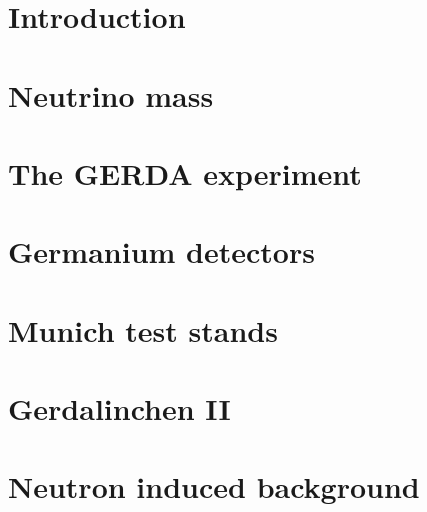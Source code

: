 \documentclass[11pt,a4paper]{book}
\begin{document}
\pagestyle{empty}



\cleardoublepage



\cleardoublepage \setcounter{page}{1} 

\tableofcontents

\cleardoublepage \setcounter{page}{1} 

\pagestyle{headings}

\chapter{Introduction}
\label{cha:intro}

\clearpage{\pagestyle{empty}\cleardoublepage}

\chapter{Neutrino mass}
\label{cha:theory}

\clearpage{\pagestyle{empty}\cleardoublepage}

\chapter{The GERDA experiment}
\label{cha:gerda}

\clearpage{\pagestyle{empty}\cleardoublepage}

\chapter{Germanium detectors}
\label{cha:detector}

\clearpage{\pagestyle{empty}\cleardoublepage}

\chapter{Munich test stands}
\label{cha:teststand}

\clearpage{\pagestyle{empty}\cleardoublepage}

\chapter{Gerdalinchen II}
\label{cha:gerdalinchenII}

\clearpage{\pagestyle{empty}\cleardoublepage}

\chapter{Neutron induced background}
\label{cha:neutron}

\end{document}
